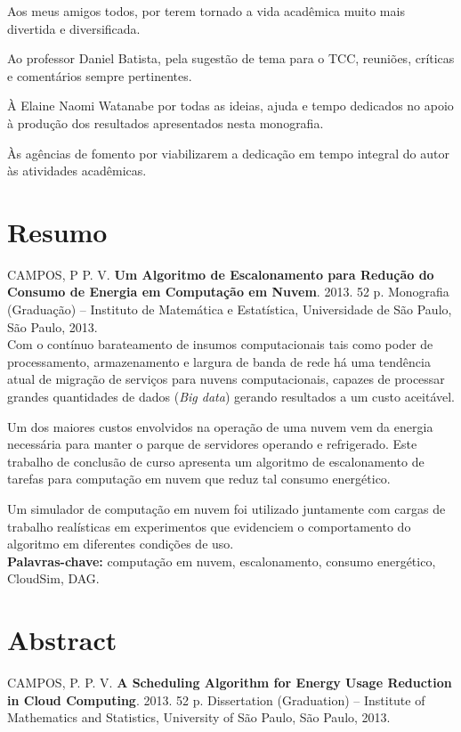 \documentclass[11pt,twoside,a4paper]{book}
\begin{document}
Aos meus amigos todos, por terem tornado a vida acadêmica muito mais divertida e
diversificada.

Ao professor Daniel Batista, pela sugestão de tema para o TCC, reuniões,
críticas e comentários sempre pertinentes.

À Elaine Naomi Watanabe por todas as ideias, ajuda e tempo dedicados no apoio à
produção dos resultados apresentados nesta monografia.

Às agências de fomento por viabilizarem a dedicação em tempo integral do autor
às atividades acadêmicas.

\chapter*{Resumo}

\noindent CAMPOS, P P. V. \textbf{Um Algoritmo de Escalonamento para Redução do
Consumo de Energia em Computação em Nuvem}. 
2013. 52 p. %
Monografia (Graduação) -- Instituto de Matemática e Estatística,
Universidade de São Paulo, São Paulo, 2013.\\

Com o contínuo barateamento de insumos computacionais tais como poder de
processamento, armazenamento e largura de banda de rede há uma tendência atual
de migração de serviços para nuvens computacionais, capazes de processar grandes
quantidades de dados (\emph{Big data}) gerando resultados a um custo
aceitável.

Um dos maiores custos envolvidos na operação de uma nuvem vem da energia
necessária para manter o parque de servidores operando e refrigerado. Este
trabalho de conclusão de curso apresenta um algoritmo
de escalonamento de tarefas para computação em nuvem que reduz tal consumo
energético.

Um simulador de computação em nuvem foi utilizado juntamente com cargas de
trabalho realísticas em experimentos que evidenciem o comportamento do
algoritmo em diferentes condições de uso.\\


\noindent \textbf{Palavras-chave:} computação em nuvem, escalonamento, consumo
energético, CloudSim, DAG.

\chapter*{Abstract}
\noindent CAMPOS, P. P. V. \textbf{A Scheduling Algorithm for Energy Usage 
Reduction in Cloud Computing}.
2013. 52 p.
Dissertation (Graduation) -- Institute of Mathematics and Statistics,
University of São Paulo, São Paulo, 2013.\\
\end{document}
